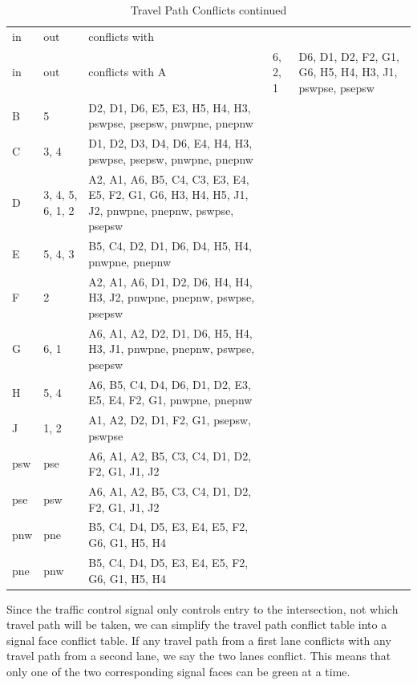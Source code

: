 \documentclass[letterpaper,twoside]{article}
\begin{document}
\begin{longtable}{l | l | p{8cm}}
  \caption{Travel Path Conflicts} \\
  in & out & conflicts with \endfirsthead
  \caption{Travel Path Conflicts continued} \\
  in & out & conflicts with \endhead
  \hline
  A & 6, 2, 1 & D6, D1, D2, F2, G1, G6, H5, H4, H3, J1, pswpse, psepsw \\
  B & 5 & D2, D1, D6, E5, E3, H5, H4, H3, pswpse, psepsw, pnwpne, pnepnw \\
  C & 3, 4 & D1, D2, D3, D4, D6, E4, H4, H3, pswpse, psepsw, pnwpne, pnepnw \\
  D & 3, 4, 5, 6, 1, 2 & A2, A1, A6, B5, C4, C3, E3, E4, E5, F2, G1, G6, H3,
  H4, H5, J1, J2, pnwpne, pnepnw, pswpse, psepsw \\
  E & 5, 4, 3 & B5, C4, D2, D1, D6, D4, H5, H4, pnwpne, pnepnw  \\
  F & 2 & A2, A1, A6, D1, D2, D6, H4, H4, H3, J2, pnwpne, pnepnw, pswpse,
  psepsw \\
  G & 6, 1 & A6, A1, A2, D2, D1, D6, H5, H4, H3, J1, pnwpne, pnepnw, pswpse,
  psepsw \\
  H & 5, 4 & A6, B5, C4, D4, D6, D1, D2, E3, E5, E4, F2, G1, pnwpne, pnepnw \\
  J & 1, 2 & A1, A2, D2, D1, F2, G1, psepsw, pswpse \\
  psw & pse & A6, A1, A2, B5, C3, C4, D1, D2, F2, G1, J1, J2 \\
  pse & psw & A6, A1, A2, B5, C3, C4, D1, D2, F2, G1, J1, J2 \\
  pnw & pne & B5, C4, D4, D5, E3, E4, E5, F2, G6, G1, H5, H4 \\
  pne & pnw & B5, C4, D4, D5, E3, E4, E5, F2, G6, G1, H5, H4 \\
\end{longtable}

Since the traffic control signal only controls entry to the
intersection, not which travel path will be taken,
we can simplify the travel path conflict table into a signal face
conflict table.  If any travel path from a first lane conflicts with
any travel path from a second lane, we say the two lanes conflict.
This means that only one of the two corresponding signal faces
can be green at a time.
\end{document}
